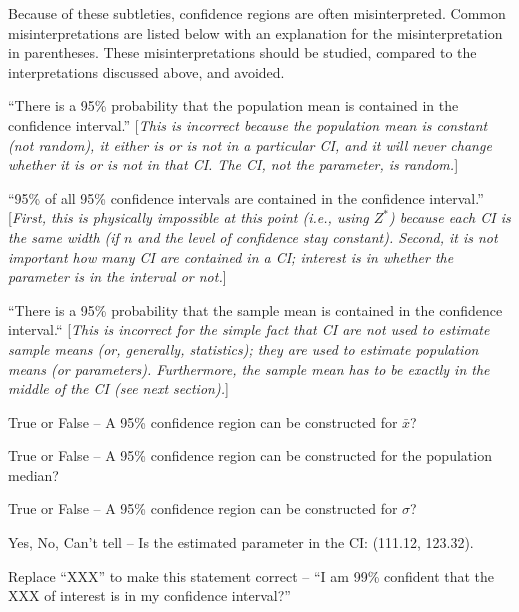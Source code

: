\documentclass[10pt,openany]{book}\usepackage[]{graphicx}\usepackage[]{color}
\begin{document}
Because of these subtleties, confidence regions are often misinterpreted.  Common misinterpretations are listed below with an explanation for the misinterpretation in parentheses.  These misinterpretations should be studied, compared to the interpretations discussed above, and avoided.
\vspace{-12pt}
\begin{Enumerate}
  \item ``There is a 95\% probability that the population mean is contained in the confidence interval.'' [\textit{This is incorrect because the population mean is constant (not random), it either is or is not in a particular CI, and it will never change whether it is or is not in that CI. The CI, not the parameter, is random.}]
  \item ``95\% of all 95\% confidence intervals are contained in the confidence interval.'' [\textit{First, this is physically impossible at this point (i.e., using $Z^{*}$) because each CI is the same width (if $n$ and the level of confidence stay constant).  Second, it is not important how many CI are contained in a CI; interest is in whether the parameter is in the interval or not.}]
  \item ``There is a 95\% probability that the sample mean is contained in the confidence interval.`` [\textit{This is incorrect for the simple fact that CI are not used to estimate sample means (or, generally, statistics); they are used to estimate population means (or parameters).  Furthermore, the sample mean has to be exactly in the middle of the CI (see next section).}]
\end{Enumerate}

\vspace{-12pt}

\vspace{-12pt}

\vspace{-16pt}
\begin{exsection}
\vspace{-9pt}
  \item \label{revex:CIstat1TF} True or False -- A 95\% confidence region can be constructed for $\bar{x}$? 
  \item \label{revex:CIparam1TF} True or False -- A 95\% confidence region can be constructed for the population median? 
  \item \label{revex:CIparam2TF} True or False -- A 95\% confidence region can be constructed for $\sigma$? 
  \item \label{revex:CIparam3YNC} Yes, No, Can't tell -- Is the estimated parameter in the CI: (111.12, 123.32).  
  \item \label{revex:CIparam4C} Replace ``XXX'' to make this statement correct -- ``I am 99\% confident that the XXX of interest is in my confidence interval?'' 
\end{exsection}
\end{document}
